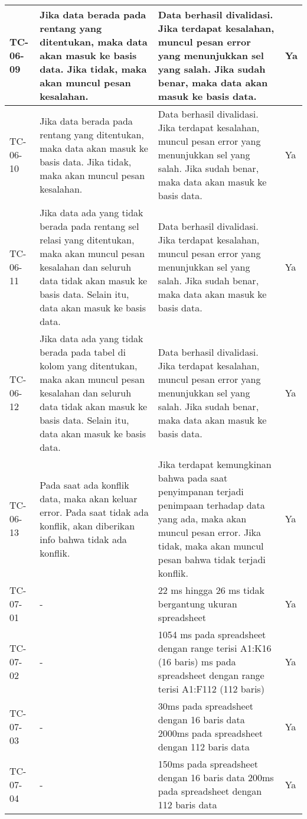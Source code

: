 \begin{small}
\begin{longtable}{ | p{2cm} | p{4cm} | p{4cm} | p{2cm} | }
	\\ \hline TC-06-09 & Jika data berada pada rentang yang ditentukan, maka data akan masuk ke basis data. Jika tidak, maka akan muncul pesan kesalahan. & Data berhasil divalidasi. Jika terdapat kesalahan, muncul pesan error yang menunjukkan sel yang salah. Jika sudah benar, maka data akan masuk ke basis data. & Ya
	\\ \hline TC-06-10 & Jika data berada pada rentang yang ditentukan, maka data akan masuk ke basis data. Jika tidak, maka akan muncul pesan kesalahan. & Data berhasil divalidasi. Jika terdapat kesalahan, muncul pesan error yang menunjukkan sel yang salah. Jika sudah benar, maka data akan masuk ke basis data. & Ya
	\\ \hline TC-06-11 & Jika data ada yang tidak berada pada rentang sel relasi yang ditentukan, maka akan muncul pesan kesalahan dan seluruh data tidak akan masuk ke basis data. Selain itu, data akan masuk ke basis data. & Data berhasil divalidasi. Jika terdapat kesalahan, muncul pesan error yang menunjukkan sel yang salah. Jika sudah benar, maka data akan masuk ke basis data. & Ya
	\\ \hline TC-06-12 & Jika data ada yang tidak berada pada tabel di kolom yang ditentukan, maka akan muncul pesan kesalahan dan seluruh data tidak akan masuk ke basis data. Selain itu, data akan masuk ke basis data. & Data berhasil divalidasi. Jika terdapat kesalahan, muncul pesan error yang menunjukkan sel yang salah. Jika sudah benar, maka data akan masuk ke basis data. & Ya
	\\ \hline TC-06-13 & Pada saat ada konflik data, maka akan keluar error. Pada saat tidak ada konflik, akan diberikan info bahwa tidak ada konflik. & Jika terdapat kemungkinan bahwa pada saat penyimpanan terjadi penimpaan terhadap data yang ada, maka akan muncul pesan error. Jika tidak, maka  akan muncul pesan bahwa tidak terjadi konflik. & Ya

	\\ \hline TC-07-01 & - & 22 ms hingga 26 ms tidak bergantung ukuran spreadsheet & Ya
	\\ \hline TC-07-02 & - & 1054 ms pada spreadsheet dengan range terisi A1:K16 (16 baris) \newline 5736 ms pada spreadsheet dengan range terisi A1:F112 (112 baris) & Ya
	\\ \hline TC-07-03 & - & 30ms pada spreadsheet dengan 16 baris data \newline 2000ms pada spreadsheet dengan 112 baris data & Ya
	\\ \hline TC-07-04 & - & 150ms pada spreadsheet dengan 16 baris data \newline 200ms pada spreadsheet dengan 112 baris data & Ya
	\\ \hline
\end{longtable}
\end{small}